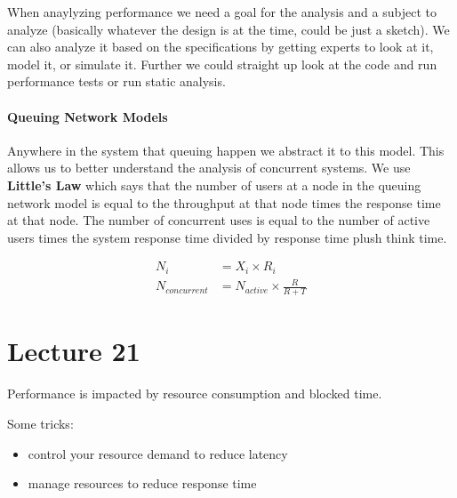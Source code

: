 \documentclass{article}
\begin{document}
When anaylyzing performance we need a goal for the analysis and a subject to analyze (basically whatever the design is at the time, could be just a sketch). We can also analyze it based on the specifications by getting experts to look at it, model it, or simulate it. Further we could straight up look at the code and run performance tests or run static analysis.

\paragraph{Queuing Network Models} %
\label{par:queuing_network_models}
Anywhere in the system that queuing happen we abstract it to this model. This allows us to better understand the analysis of concurrent systems. We use \textbf{Little's Law} which says that the number of users at a node in the queuing network model is equal to the throughput at that node times the response time at that node. The number of concurrent uses is equal to the number of active users times the system response time divided by response time plush think time.

\begin{align*}
    N_i &= X_i \times R_i\\
    N_{concurrent} &= N_{active}\times \frac{R}{R+T}
\end{align*}




\section*{Lecture 21} %
\label{sec:lecture_21}
Performance is impacted by resource consumption and blocked time.

Some tricks:
\begin{itemize}
    \item control your resource demand to reduce latency
    \item manage resources to reduce response time
\end{itemize}
\end{document}
